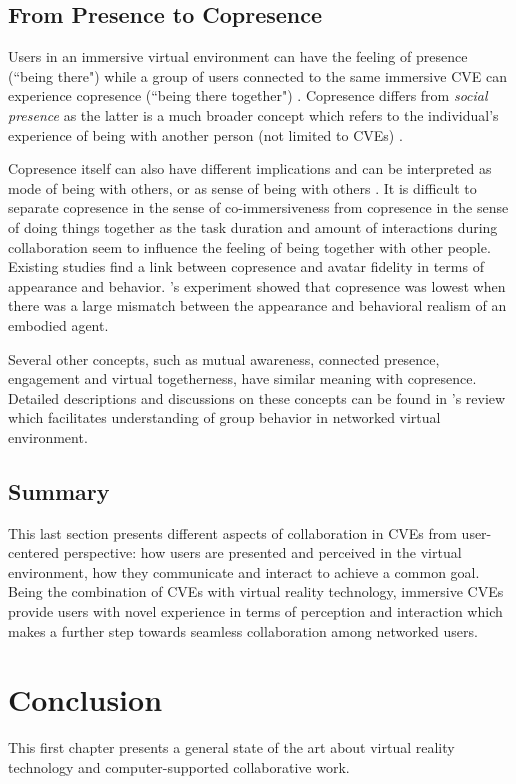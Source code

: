 \subsection{From Presence to Copresence}
Users in an immersive virtual environment can have the feeling of presence (``being there") while a group of users connected to the same immersive CVE can experience copresence (``being there together") \citep{Slater2000Small}. Copresence differs from \textit{social presence} as the latter is a much broader concept which refers to the individual's experience of being with another person (not limited to CVEs) \citep{Schroeder2002Copresence}.

Copresence itself can also have different implications and can be interpreted as mode of being with others, or as sense of being with others \citep{Zhao2003Taxonomy}. It is difficult to separate copresence in the sense of co-immersiveness from copresence in the sense of doing things together \citep{Schroeder2002Copresence} as the task duration and amount of interactions during collaboration seem to influence the feeling of being together with other people. Existing studies \citep{Slater2002Meeting, Garau2003Thesis} find a link between copresence and avatar fidelity in terms of appearance and behavior. \citet{Bailenson2005Copresence}'s experiment showed that copresence was lowest when there was a large mismatch between the appearance and behavioral realism of an embodied agent.

Several other concepts, such as mutual awareness, connected presence, engagement and virtual togetherness, have similar meaning with copresence. Detailed descriptions and discussions on these concepts can be found in \citet{Schroeder2006Being}'s review which facilitates understanding of group behavior in networked virtual environment. 


\subsection{Summary}
This last section presents different aspects of collaboration in CVEs from user-centered perspective: how users are presented and perceived in the virtual environment, how they communicate and interact to achieve a common goal. Being the combination of CVEs with virtual reality technology, immersive CVEs provide users with novel experience in terms of perception and interaction which makes a further step towards seamless collaboration among networked users. 


\section{Conclusion}
This first chapter presents a general state of the art about virtual reality technology and computer-supported collaborative work.
